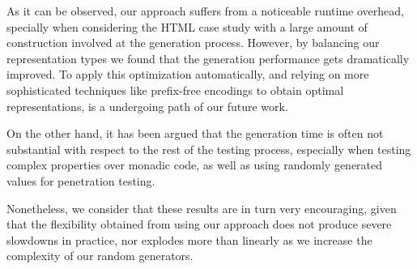 As it can be observed, our approach suffers from a noticeable runtime overhead,
specially when considering the HTML case study with a large amount of
construction involved at the generation process.
%
However, by balancing our representation types we found that the generation
performance gets dramatically improved.
%
To apply this optimization automatically, and relying on more sophisticated
techniques like prefix-free encodings to obtain optimal representations, is a
undergoing path of our future work.


On the other hand, it has been argued that the generation time is often not
substantial with respect to the rest of the testing process, especially when
testing complex properties over monadic code, as well as using randomly
generated values for penetration testing.


Nonetheless, we consider that these results are in turn very encouraging, given
that the flexibility obtained from using our approach does not produce severe
slowdowns in practice, nor explodes more than linearly as we increase the
complexity of our random generators.
